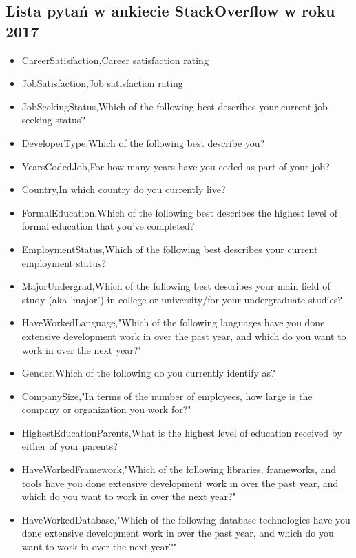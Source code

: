 
\appendix
\begin{appendices}
    \chapter{Lista pytań w ankiecie StackOverflow w roku 2017}\label{app:dod1}
    \begin{itemize}
        \item CareerSatisfaction,Career satisfaction rating
        \item JobSatisfaction,Job satisfaction rating
        \item JobSeekingStatus,Which of the following best describes your current job-seeking status?
        \item DeveloperType,Which of the following best describe you?
        \item YearsCodedJob,For how many years have you coded as part of your job?
        \item Country,In which country do you currently live?
        \item FormalEducation,Which of the following best describes the highest level of formal education that you've completed?
        \item EmploymentStatus,Which of the following best describes your current employment status?
        \item MajorUndergrad,Which of the following best describes your main field of study (aka 'major') in college or university/for your undergraduate studies?
        \item HaveWorkedLanguage,"Which of the following languages have you done extensive development work in over the past year, and which do you want to work in over the next year?"
        \item Gender,Which of the following do you currently identify as?
        \item CompanySize,"In terms of the number of employees, how large is the company or organization you work for?"
        \item HighestEducationParents,What is the highest level of education received by either of your parents?
        \item HaveWorkedFramework,"Which of the following libraries, frameworks, and tools have you done extensive development work in over the past year, and which do you want to work in over the next year?"
        \item HaveWorkedDatabase,"Which of the following database technologies have you done extensive development work in over the past year, and which do you want to work in over the next year?"

\end{itemize}
\end{appendices}
